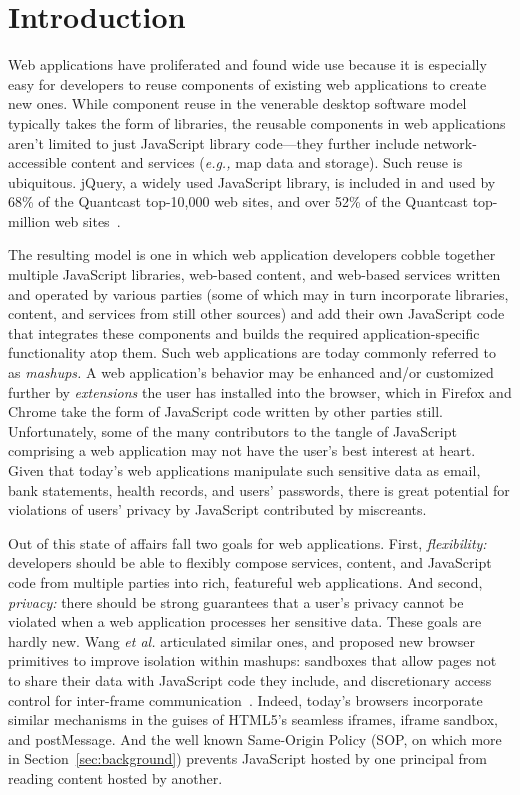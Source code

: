 \section{Introduction}
\label{sec:intro}

Web applications have proliferated and found wide use because it is
especially easy for developers to reuse components of existing web
applications to create new ones. While component reuse in the
venerable desktop software model typically takes the form of
libraries, the reusable components in web applications aren't limited
to just JavaScript library code---they further include
network-accessible content and services ({\em e.g.,} map data and
storage). Such reuse is ubiquitous. jQuery, a widely used JavaScript
library, is included in and used by 68\% of the Quantcast top-10,000
web sites, and over 52\% of the Quantcast top-million web
sites~\cite{quantcast}.

The resulting model is one in which web application developers cobble
together multiple JavaScript libraries, web-based content, and
web-based services written and operated by various parties (some of
which may in turn incorporate libraries, content, and services from
still other sources) and add their own JavaScript code that integrates
these components and builds the required application-specific
functionality atop them. Such web applications are today commonly
referred to as {\em mashups.} A web application's behavior may be
enhanced and/or customized further by {\em extensions} the
user has installed into the browser, which in Firefox and Chrome take
the form of JavaScript code written by other parties
still. Unfortunately, some of the many contributors to the tangle of
JavaScript comprising a web application may not have the user's best
interest at heart. Given that today's web applications manipulate such
sensitive data as email, bank statements, health records, and users'
passwords, there is great potential for violations of users' privacy
by JavaScript contributed by miscreants.

Out of this state of affairs fall two goals for web
applications. First, {\em flexibility:} developers should be able to
flexibly compose services, content, and JavaScript code from multiple
parties into rich, featureful web applications. And second, {\em
  privacy:} there should be strong guarantees that a user's privacy
cannot be violated when a web application processes her sensitive
data. These goals are hardly new. Wang {\em et al.} articulated
similar ones, and proposed new browser primitives to improve isolation
within mashups: sandboxes that allow pages not to share their data
with JavaScript code they include, and discretionary access control
for inter-frame communication~\cite{mashupos}. Indeed, today's
browsers incorporate similar mechanisms in the guises of HTML5's
seamless iframes, iframe sandbox, and postMessage. And the well known
Same-Origin Policy (SOP, on which more in
Section~\ref{sec:background}) prevents JavaScript hosted by one
principal from reading content hosted by another.

